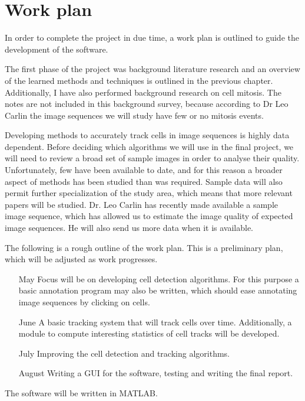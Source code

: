 \documentclass[12pt,a4paper,openany]{book}
\begin{document}
\chapter{Work plan}
\label{chap:workplan}

In order to complete the project in due time, a work plan is outlined to guide the development of the software.

The first phase of the project was background literature research and an overview of the learned methods and techniques is outlined in the previous chapter. Additionally, I have also performed background research on cell mitosis. The notes are not included in this background survey, because according to Dr Leo Carlin the image sequences we will study have few or no mitosis events.

Developing methods to accurately track cells in image sequences is highly data dependent. Before deciding which algorithms we will use in the final project, we will need to review a broad set of sample images in order to analyse their quality. Unfortunately, few have been available to date, and for this reason a broader aspect of methods has been studied than was required. Sample data will also permit further specialization of the study area, which means that more relevant papers will be studied. Dr. Leo Carlin has recently made available a sample image sequence, which has allowed us to estimate the image quality of expected image sequences. He will also send us more data when it is available.

The following is a rough outline of the work plan. This is a preliminary plan, which will be adjusted as work progresses.

\begin{enumerate}
  \item [May] Focus will be on developing cell detection algorithms. For this purpose a basic annotation program may also be written, which should ease annotating image sequences by clicking on cells.
  \item [June] A basic tracking system that will track cells over time. Additionally, a module to compute interesting statistics of cell tracks will be developed.
  \item[July] Improving the cell detection and tracking algorithms. 
  \item [August] Writing a GUI for the software, testing and writing the final report.
\end{enumerate}

The software will be written in MATLAB.



\newpage


\label{page_bibliography}
 
\end{document}
